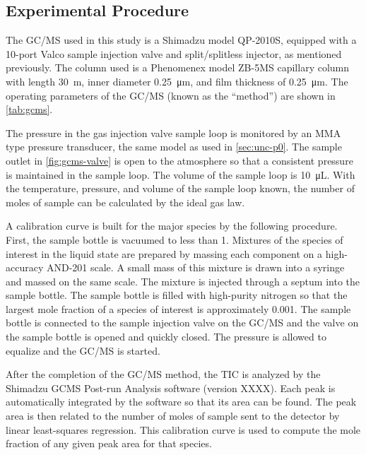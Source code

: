 \documentclass[../main.tex]{subfiles}
\begin{document}
\subsection{Experimental Procedure}
\label{sec:gcms-procedure}

The GC/MS used in this study is a
Shimadzu model QP-2010S, equipped with a 10-port Valco sample injection
valve and split/splitless injector, as mentioned previously. The column
used is a Phenomenex model ZB-5MS capillary column
with length \SI{30}{\meter}, inner diameter \SI{0.25}{\micro\meter}, and film
thickness of \SI{0.25}{\micro\meter}. The operating parameters of the GC/MS
(known as the ``method'') are shown in \cref{tab:gcms}.

The pressure in the gas injection valve sample loop is monitored by an
MMA type pressure transducer, the same model as used in \cref{sec:unc-p0}. The
sample outlet in \cref{fig:gcms-valve} is open to the atmosphere
so that a consistent pressure is maintained in the sample loop.
The volume of the sample loop is \SI{10}{\micro\liter}. With
the temperature, pressure, and volume of the sample loop known,
the number of moles of sample can be calculated by the ideal
gas law.

A calibration curve is built for the major species by the
following procedure. First, the sample bottle is vacuumed
to less than \SI{1}{\torr}. Mixtures of the species of
interest in the liquid state are prepared by massing each
component on a high-accuracy AND-201 scale. A small mass
of this mixture is drawn into a syringe and massed on the
same scale. The mixture is injected through a septum into
the sample bottle. The sample bottle is filled with
high-purity nitrogen so that the largest mole fraction of
a species of interest is approximately 0.001. The sample
bottle is connected to the sample injection valve on the
GC/MS and the valve on the sample bottle is opened and
quickly closed. The pressure is allowed to equalize and
the GC/MS is started.

After the completion of the GC/MS method, the TIC is analyzed by the
Shimadzu GCMS Post-run Analysis software (version XXXX). Each peak is
automatically integrated by the software so that its area can be found.
The peak area is then related to the number of moles of
sample sent to the detector by linear least-squares regression.
This calibration curve is used to compute the mole fraction
of any given peak area for that species.
\end{document}
